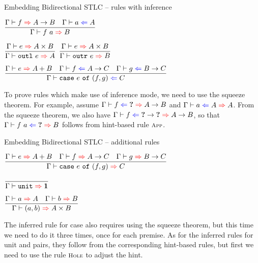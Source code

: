 \documentclass{beamer}
\begin{document}
\begin{frame}{Embedding Bidirectional STLC -- rules with inference}

\begin{center}
  $\infrule{\infer{f}{\Fun{A}{B}} \quad \check{a}{A}}{\infer{\app{f}{a}}{B}}$

  \vspace{2em}

  $\infrule{\infer{e}{\Prod{A}{B}}}{\infer{\outl{e}}{A}}$ \quad
  $\infrule{\infer{e}{\Prod{A}{B}}}{\infer{\outr{e}}{B}}$

  \vspace{2em}

  $\infrule{\infer{e}{\Sum{A}{B}} \quad \check{f}{\Fun{A}{C}} \quad \check{g}{\Fun{B}{C}}}{\check{\case{e}{f}{g}}{C}}$
\end{center}

\vspace{1em}

To prove rules which make use of inference mode, we need to use the squeeze theorem. For example, assume $\hinting{f}{\Hole}{\Fun{A}{B}}$ and $\hinting{a}{A}{A}$. From the squeeze theorem, we also have $\hinting{f}{\Fun{\Hole}{\Hole}}{\Fun{A}{B}}$, so that $\hinting{\app{f}{a}}{\Hole}{B}$ follows from hint-based rule $\textsc{\footnotesize{App}}$.

\end{frame}

\begin{frame}{Embedding Bidirectional STLC -- additional rules}

\begin{center}
  $\infrule{\infer{e}{\Sum{A}{B}} \quad \infer{f}{\Fun{A}{C}} \quad \infer{g}{\Fun{B}{C}}}{\infer{\case{e}{f}{g}}{C}}$

  \vspace{2em}

  $\infrule{}{\infer{\unit}{\Unit}}$

  \vspace{2em}

  $\infrule{\infer{a}{A} \quad \infer{b}{B}}{\infer{\pair{a}{b}}{\Prod{A}{B}}}$
\end{center}

\vspace{1em}

The inferred rule for case also requires using the squeeze theorem, but this time we need to do it three times, once for each premise. As for the inferred rules for unit and pairs, they follow from the corresponding hint-based rules, but first we need to use the rule $\textsc{\footnotesize{Hole}}$ to adjust the hint.

\end{frame}
\end{document}
